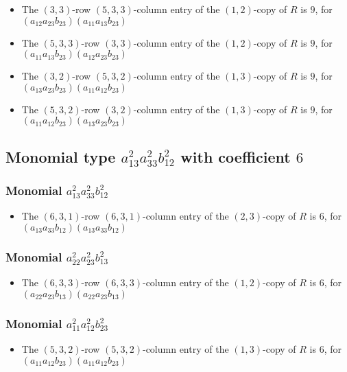 \documentclass{article}
\begin{document}
\begin{itemize}
\item The $(3, 3)$-row $(5, 3, 3)$-column entry of the $ \left(1, 2\right) $-copy of $R$ is $ 9 $, for $( a_{12} a_{23} b_{23} )( a_{11} a_{13} b_{23} )$ 
\item The $(5, 3, 3)$-row $(3, 3)$-column entry of the $ \left(1, 2\right) $-copy of $R$ is $ 9 $, for $( a_{11} a_{13} b_{23} )( a_{12} a_{23} b_{23} )$ 
\item The $(3, 2)$-row $(5, 3, 2)$-column entry of the $ \left(1, 3\right) $-copy of $R$ is $ 9 $, for $( a_{13} a_{23} b_{23} )( a_{11} a_{12} b_{23} )$ 
\item The $(5, 3, 2)$-row $(3, 2)$-column entry of the $ \left(1, 3\right) $-copy of $R$ is $ 9 $, for $( a_{11} a_{12} b_{23} )( a_{13} a_{23} b_{23} )$ 
\end{itemize}
\subsection{Monomial type $ a_{13}^{2} a_{33}^{2} b_{12}^{2} $ with coefficient $ 6 $}

\subsubsection{Monomial $ a_{13}^{2} a_{33}^{2} b_{12}^{2} $}

\begin{itemize}
\item The $(6, 3, 1)$-row $(6, 3, 1)$-column entry of the $ \left(2, 3\right) $-copy of $R$ is $ 6 $, for $( a_{13} a_{33} b_{12} )( a_{13} a_{33} b_{12} )$ 
\end{itemize}
\subsubsection{Monomial $ a_{22}^{2} a_{23}^{2} b_{13}^{2} $}

\begin{itemize}
\item The $(6, 3, 3)$-row $(6, 3, 3)$-column entry of the $ \left(1, 2\right) $-copy of $R$ is $ 6 $, for $( a_{22} a_{23} b_{13} )( a_{22} a_{23} b_{13} )$ 
\end{itemize}
\subsubsection{Monomial $ a_{11}^{2} a_{12}^{2} b_{23}^{2} $}

\begin{itemize}
\item The $(5, 3, 2)$-row $(5, 3, 2)$-column entry of the $ \left(1, 3\right) $-copy of $R$ is $ 6 $, for $( a_{11} a_{12} b_{23} )( a_{11} a_{12} b_{23} )$ 
\end{itemize}
\end{document}

